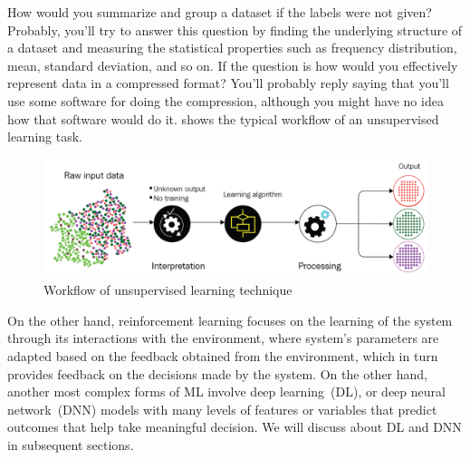 \hspace*{3.5mm} How would you summarize and group a dataset if the labels were not given? Probably, you'll try to answer this question by finding the underlying structure of a dataset and measuring the statistical properties such as frequency distribution, mean, standard deviation, and so on. If the question is how would you effectively represent data in a compressed format? You'll probably reply saying that you'll use some software for doing the compression, although you might have no idea how that software would do it.  shows the typical workflow of an unsupervised learning task. 

\begin{figure}[h]
	\centering
	\includegraphics[scale=0.9]{images/unsup.png}
	\caption[Workflow of unsupervised learning technique]{Workflow of unsupervised learning technique~\cite{karimScalaML2019}} 
	\label{fig:ml_pipeline_unsup}
\end{figure}

\hspace*{3.5mm} On the other hand, reinforcement learning focuses on the learning of the system through its interactions with the environment, where system's parameters are adapted based on the feedback obtained from the environment, which in turn provides feedback on the decisions made by the system. On the other hand, another most complex forms of ML involve deep learning~(DL), or deep neural network~(DNN) models with many levels of features or variables that predict outcomes that help take meaningful decision. We will discuss about DL and DNN in subsequent sections. 



